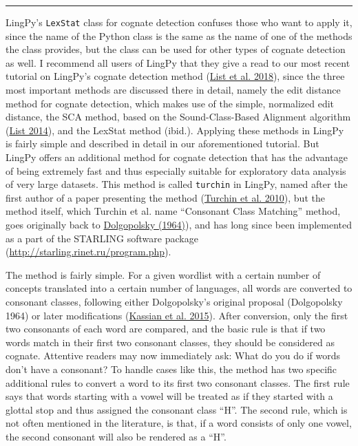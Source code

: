 \documentclass[
  a4paper,
  14pt,
  oneside,
  tablecaptionabove
]{scrbook}
\begin{document}
\begin{center}\rule{0.5\linewidth}{1pt}\end{center}

LingPy's \lstinline!LexStat! class for cognate detection confuses those
who want to apply it, since the name of the Python class is the same as
the name of one of the methods the class provides, but the class can be
used for other types of cognate detection as well. I recommend all users
of LingPy that they give a read to our most recent tutorial on LingPy's
cognate detection method (\href{http://bibliography.lingpy.org?key=List2018d}{List et al. 2018}),
since the three most important methods are discussed there in detail,
namely the edit distance method for cognate detection, which makes use
of the simple, normalized edit distance, the SCA method, based on the
Sound-Class-Based Alignment algorithm (\href{http://bibliography.lingpy.org?key=List2014d}{List 2014}), and
the LexStat method (ibid.). Applying these methods in LingPy is fairly
simple and described in detail in our aforementioned tutorial. But
LingPy offers an additional method for cognate detection that has the
advantage of being extremely fast and thus especially suitable for
exploratory data analysis of very large datasets. This method is called
\lstinline!turchin! in LingPy, named after the first author of a paper
presenting the method (\href{http://bibliography.lingpy.org?key=Turchin2010}{Turchin et al.
2010}), but the method itself, which Turchin et al. name
\enquote{Consonant Class Matching} method, goes originally back to
\href{http://bibliography.lingpy.org?key=Dolgopolsky1964}{Dolgopolsky
(1964)}), and has long since been implemented as a part of the STARLING
software package (\href{http://starling.rinet.ru/program.php?lan=en}{http://starling.rinet.ru/program.php}).

The method is fairly simple. For a given wordlist with a certain number
of concepts translated into a certain number of languages, all words are
converted to consonant classes, following either Dolgopolsky's original
proposal (Dolgopolsky 1964) or later modifications (\href{http://bibliography.lingpy.org?key=Kassian2015b}{Kassian et al.
2015}). After conversion, only the first two consonants of each word
are compared, and the basic rule is that if two words match in their
first two consonant classes, they should be considered as cognate.
Attentive readers may now immediately ask: What do you do if words don't
have a consonant? To handle cases like this, the method has two specific
additional rules to convert a word to its first two consonant classes.
The first rule says that words starting with a vowel will be treated as
if they started with a glottal stop and thus assigned the consonant
class \enquote{H}. The second rule, which is not often mentioned in the
literature, is that, if a word consists of only one vowel, the second
consonant will also be rendered as a \enquote{H}.
\end{document}
